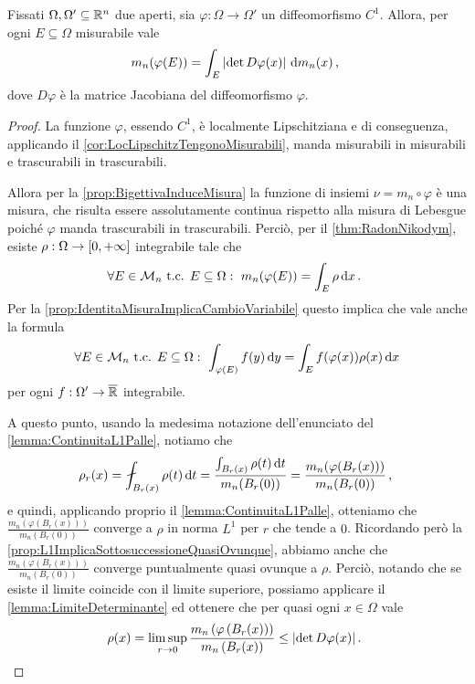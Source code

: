 \begin{lemma}\label{lemma:MisuraImmagine}
	Fissati $\Omega,\Omega'\subseteq\mathbb R^n$ due aperti, sia $\varphi:\Omega\to\Omega'$ un diffeomorfismo $C^1$.
	Allora, per ogni $E\subseteq \Omega$ misurabile vale
	\begin{equation*}
		m_n(\varphi(E))=\int_E\left\lvert \det D\varphi(x) \right\rvert \,\mathrm d m_n(x)\, \text{, }
	\end{equation*}
	dove $D\varphi$ è la matrice Jacobiana del diffeomorfismo $\varphi$.
\end{lemma}
\begin{proof}
	La funzione $\varphi$, essendo $C^1$, è localmente Lipschitziana e di conseguenza, applicando il \cref{cor:LocLipschitzTengonoMisurabili}, manda misurabili in misurabili e trascurabili in trascurabili.
	
	Allora per la \cref{prop:BigettivaInduceMisura} la funzione di insiemi $\nu=m_n\circ \varphi$ è una misura, che risulta essere assolutamente continua rispetto alla misura di Lebesgue poiché $\varphi$ manda trascurabili in trascurabili.
	Perciò, per il \cref{thm:RadonNikodym}, esiste $\rho:\Omega\to[0,+\infty]$ integrabile tale che
	\begin{equation*}
		\forall E\in \mathcal M_n\text{ t.c. } E\subseteq \Omega:\ m_n(\varphi(E))=\int_E \rho \,\mathrm d x \, \text{. }
	\end{equation*}
	Per la \cref{prop:IdentitaMisuraImplicaCambioVariabile} questo implica che vale anche la formula
	\begin{equation}\label{eq:CambioRadonNikodym}
		\forall E\in \M_n\text{ t.c. } E\subseteq\Omega:\ \int_{\varphi(E)} f(y)\de y = \int_{E} f(\varphi(x))\rho(x) \de x
	\end{equation}
	per ogni $f:\Omega'\to\overline{\mathbb R}$ integrabile.
	
	A questo punto, usando la medesima notazione dell'enunciato del \cref{lemma:ContinuitaL1Palle}, notiamo che
	\begin{equation*}
		\rho_r(x)=\aint_{B_r(x)}\rho(t)\de t=\frac{\int_{B_r(x)} \rho(t)\de t}{m_n(B_r(0))}=\frac{m_n(\varphi(B_r(x)))}{m_n(B_r(0))}\virgola
	\end{equation*}
	e quindi, applicando proprio il \cref{lemma:ContinuitaL1Palle}, otteniamo che $\frac{m_n(\varphi(B_r(x)))}{m_n(B_r(0))}$ converge a $\rho$ in norma $L^1$ per $r$ che tende a $0$.
	Ricordando però la \cref{prop:L1ImplicaSottosuccessioneQuasiOvunque}, abbiamo anche che $\frac{m_n(\varphi(B_r(x)))}{m_n(B_r(0))}$ converge puntualmente quasi ovunque a $\rho$. Perciò, notando che se esiste il limite coincide con il limite superiore, possiamo applicare il \cref{lemma:LimiteDeterminante} ed ottenere che per quasi ogni $x\in\Omega$ vale
	\begin{equation}\label{eq:DisuguaglianzaRadonNikodym}
		\rho(x)=\limsup_{r\to 0} \frac{ m_n\left(\varphi\left(B_r(x)\right)\right)} {m_n\left(B_r(x)\right)}\le \lvert\det D\varphi(x)\rvert \, \text{. }
	\end{equation}
	

\end{proof}
